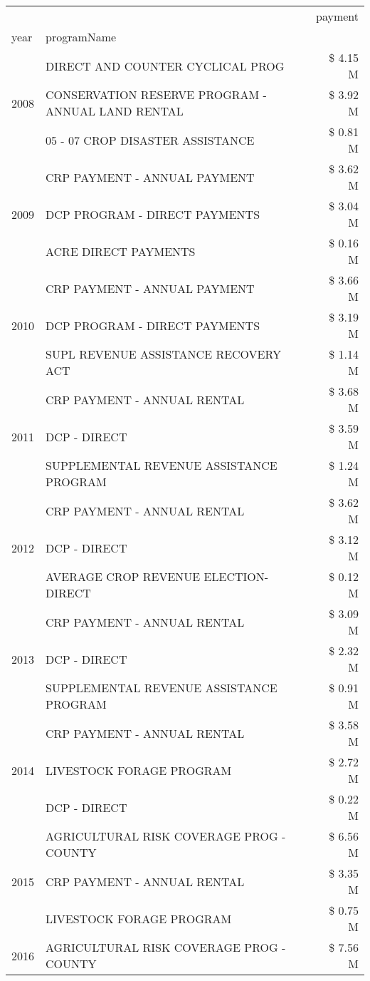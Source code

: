 \begin{tabular}{llr}
\toprule
 &  & payment \\
year & programName &  \\
\midrule
\multirow[t]{3}{*}{2008} & DIRECT AND COUNTER CYCLICAL PROG & \$ 4.15 M \\
 & CONSERVATION RESERVE PROGRAM - ANNUAL LAND RENTAL & \$ 3.92 M \\
 & 05 - 07 CROP DISASTER ASSISTANCE & \$ 0.81 M \\
\cline{1-3}
\multirow[t]{3}{*}{2009} & CRP PAYMENT - ANNUAL PAYMENT & \$ 3.62 M \\
 & DCP PROGRAM - DIRECT PAYMENTS & \$ 3.04 M \\
 & ACRE DIRECT PAYMENTS & \$ 0.16 M \\
\cline{1-3}
\multirow[t]{3}{*}{2010} & CRP PAYMENT - ANNUAL PAYMENT & \$ 3.66 M \\
 & DCP PROGRAM - DIRECT PAYMENTS & \$ 3.19 M \\
 & SUPL REVENUE ASSISTANCE RECOVERY ACT & \$ 1.14 M \\
\cline{1-3}
\multirow[t]{3}{*}{2011} & CRP PAYMENT - ANNUAL RENTAL & \$ 3.68 M \\
 & DCP - DIRECT & \$ 3.59 M \\
 & SUPPLEMENTAL REVENUE ASSISTANCE PROGRAM & \$ 1.24 M \\
\cline{1-3}
\multirow[t]{3}{*}{2012} & CRP PAYMENT - ANNUAL RENTAL & \$ 3.62 M \\
 & DCP - DIRECT & \$ 3.12 M \\
 & AVERAGE CROP REVENUE ELECTION-DIRECT & \$ 0.12 M \\
\cline{1-3}
\multirow[t]{3}{*}{2013} & CRP PAYMENT - ANNUAL RENTAL & \$ 3.09 M \\
 & DCP - DIRECT & \$ 2.32 M \\
 & SUPPLEMENTAL REVENUE ASSISTANCE PROGRAM & \$ 0.91 M \\
\cline{1-3}
\multirow[t]{3}{*}{2014} & CRP PAYMENT - ANNUAL RENTAL & \$ 3.58 M \\
 & LIVESTOCK FORAGE PROGRAM & \$ 2.72 M \\
 & DCP - DIRECT & \$ 0.22 M \\
\cline{1-3}
\multirow[t]{3}{*}{2015} & AGRICULTURAL RISK COVERAGE PROG - COUNTY & \$ 6.56 M \\
 & CRP PAYMENT - ANNUAL RENTAL & \$ 3.35 M \\
 & LIVESTOCK FORAGE PROGRAM & \$ 0.75 M \\
\cline{1-3}
\multirow[t]{3}{*}{2016} & AGRICULTURAL RISK COVERAGE PROG - COUNTY & \$ 7.56 M \\

\end{tabular}
